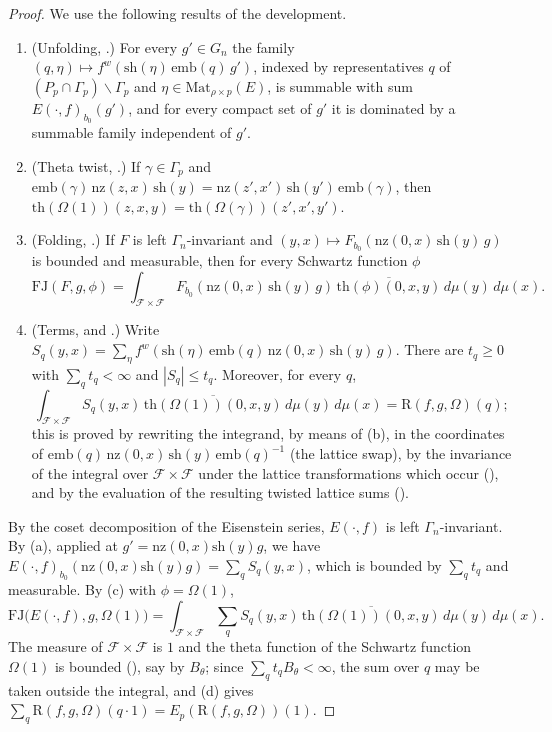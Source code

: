 \begin{proof}
We use the following results of the development.
\begin{enumerate}[label=(\alph*)]
\item (Unfolding, .) For every $g'\in G_n$ the family
$(q,\eta)\mapsto f^{w}(\mathrm{sh}(\eta)\,\mathrm{emb}(q)\,g')$, indexed by representatives $q$ of $(P_p\cap\Gamma_p)\backslash\Gamma_p$ and
$\eta\in\mathrm{Mat}_{\rho\times p}(E)$, is summable with sum $E(\cdot,f)_{b_0}(g')$, and for every compact set of $g'$ it is dominated by a summable family
independent of $g'$.
\item (Theta twist, .) If $\gamma\in\Gamma_p$ and
$\mathrm{emb}(\gamma)\,\mathrm{nz}(z,x)\,\mathrm{sh}(y)=\mathrm{nz}(z',x')\,\mathrm{sh}(y')\,\mathrm{emb}(\gamma)$, then
$\mathrm{th}(\Omega(1))(z,x,y)=\mathrm{th}(\Omega(\gamma))(z',x',y')$.
\item (Folding, .) If $F$ is left $\Gamma_n$-invariant and
$(y,x)\mapsto F_{b_0}(\mathrm{nz}(0,x)\,\mathrm{sh}(y)\,g)$ is bounded and measurable, then for every Schwartz function $\phi$
\[
\mathrm{FJ}(F,g,\phi)=\int_{\mathcal F\times\mathcal F}F_{b_0}(\mathrm{nz}(0,x)\,\mathrm{sh}(y)\,g)\,\overline{\mathrm{th}(\phi)(0,x,y)}\,d\mu(y)\,d\mu(x).
\]
\item (Terms,  and .)
Write $S_q(y,x)=\sum_\eta f^{w}(\mathrm{sh}(\eta)\,\mathrm{emb}(q)\,\mathrm{nz}(0,x)\,\mathrm{sh}(y)\,g)$. There are $t_q\ge0$ with $\sum_qt_q<\infty$ and
$|S_q|\le t_q$. Moreover, for every $q$,
\[
\int_{\mathcal F\times\mathcal F}S_q(y,x)\,\overline{\mathrm{th}(\Omega(1))(0,x,y)}\,d\mu(y)\,d\mu(x)=\mathrm R(f,g,\Omega)(q);
\]
this is proved by rewriting the integrand, by means of (b), in the coordinates of $\mathrm{emb}(q)\,\mathrm{nz}(0,x)\,\mathrm{sh}(y)\,\mathrm{emb}(q)^{-1}$
(the lattice swap), by the invariance of the integral over $\mathcal F\times\mathcal F$ under the lattice transformations which occur
(), and by the evaluation of the resulting twisted lattice sums
().
\end{enumerate}
By the coset decomposition of the Eisenstein series, $E(\cdot,f)$ is left $\Gamma_n$-invariant. By (a), applied at
$g'=\mathrm{nz}(0,x)\mathrm{sh}(y)g$, we have $E(\cdot,f)_{b_0}(\mathrm{nz}(0,x)\mathrm{sh}(y)g)=\sum_qS_q(y,x)$, which is bounded by $\sum_qt_q$ and
measurable. By (c) with $\phi=\Omega(1)$,
\[
\mathrm{FJ}\bigl(E(\cdot,f),g,\Omega(1)\bigr)=\int_{\mathcal F\times\mathcal F}\sum_qS_q(y,x)\,\overline{\mathrm{th}(\Omega(1))(0,x,y)}\,d\mu(y)\,d\mu(x).
\]
The measure of $\mathcal F\times\mathcal F$ is $1$ and the theta function of the Schwartz function $\Omega(1)$ is bounded
(), say by $B_\theta$; since $\sum_qt_qB_\theta<\infty$, the sum over $q$ may be
taken outside the integral, and (d) gives $\sum_q\mathrm R(f,g,\Omega)(q\cdot1)=E_p(\mathrm R(f,g,\Omega))(1)$.
\end{proof}

